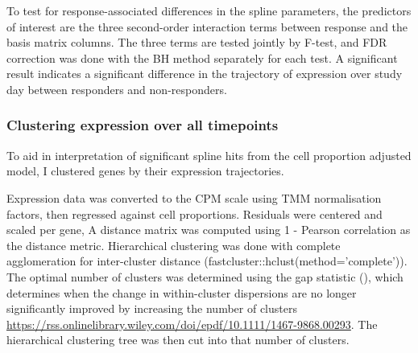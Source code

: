 To test for response-associated differences in the spline parameters, the predictors of interest are the three second-order interaction terms between response and the basis matrix columns. 
The three terms are tested jointly by F-test, and \gls{FDR} correction was done with the \gls{BH} method separately for each test.
A significant result indicates a significant difference in the trajectory of expression over study day between responders and non-responders.

\subsubsection{Clustering expression over all timepoints}

To aid in interpretation of significant spline hits from the cell proportion adjusted model, I clustered genes by their expression trajectories.

Expression data was converted to the \gls{CPM} scale using \gls{TMM} normalisation factors, then regressed against cell proportions.
Residuals were centered and scaled per gene, 
A distance matrix was computed using 1 - Pearson correlation as the distance metric.
Hierarchical clustering was done with complete agglomeration for inter-cluster distance (fastcluster::hclust(method='complete')).
The optimal number of clusters was determined using the gap statistic (),
which determines when the change in within-cluster dispersions are no longer significantly improved by increasing the number of clusters \url{https://rss.onlinelibrary.wiley.com/doi/epdf/10.1111/1467-9868.00293}.
The hierarchical clustering tree was then cut into that number of clusters.

